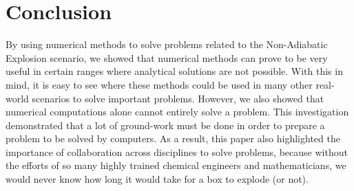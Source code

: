 \documentclass{article}
\begin{document}
\section*{Conclusion}
By using numerical methods to solve problems related to the Non-Adiabatic Explosion scenario, we showed that numerical methods can prove to be very useful in certain ranges where analytical solutions are not possible. With this in mind, it is easy to see where these methods could be used in many other real-world scenarios to solve important problems. However, we also showed that numerical computations alone cannot entirely solve a problem. This investigation demonstrated that a lot of ground-work must be done in order to prepare a problem to be solved by computers. As a result, this paper also highlighted the importance of collaboration across disciplines to solve problems, because without the efforts of so many highly trained chemical engineers and mathematicians, we would never know how long it would take for a box to explode (or not). 
\end{document}
